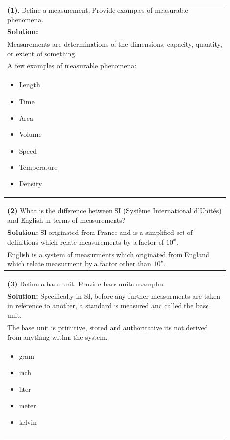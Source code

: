 \documentclass{article}
\begin{document}
\begin{tabular}{|p{0.9\linewidth}|}
\hline
\textbf{(1)}. Define a measurement. Provide examples of measurable phenomena.\\
\textbf{Solution:} \\
Measurements are determinations of the dimensions, capacity, quantity, or extent of something. \\
A few examples of measurable phenomena: \\
\begin{itemize}
    \item Length
    \item Time
    \item Area
    \item Volume
    \item Speed
    \item Temperature
    \item Density
\end{itemize} \\
\hline
\end{tabular}







\begin{tabular}{|p{0.9\linewidth}|}
\hline
\textbf{(2)} What is the difference between SI (Système International d'Unités) and English in terms of measurements?\\
\textbf{Solution:} SI originated from France and is a simplified set of definitions which relate measurements by a factor of $10^x$. \\
English is a system of measurments which originated from England which relate measurment by a factor other than $10^x$. \\
\hline
\end{tabular}
















\begin{tabular}{|p{0.9\linewidth}|}
\hline
\textbf{(3)} Define a base unit. Provide base units examples.\\
\textbf{Solution:} Specifically in SI, before any further measurments are taken in reference to another, a standard is measured and called the base unit. \\
The base unit is primitive, stored and authoritative \- its not derived from anything within the system. \\
\begin{itemize}
    \item gram
    \item inch
    \item liter
    \item meter
    \item kelvin
\end{itemize} \\
\hline
\end{tabular}
\newpage
\end{document}
